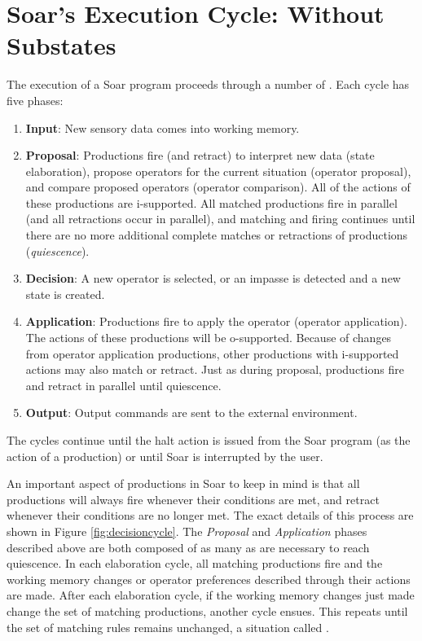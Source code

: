 \section{Soar's Execution Cycle: Without Substates}
\label{ARCH-decision}


The execution of a Soar program proceeds through a number of . Each cycle has five phases:

\begin{enumerate} 
\item \textbf{Input}: 
	New sensory data comes into working memory.
\item \textbf{Proposal}: 
	Productions fire (and retract) to interpret new data (state elaboration), propose operators for the current situation (operator proposal), and compare proposed operators (operator comparison).  All of the actions of these productions are i-supported.  All matched productions fire in parallel (and all retractions occur in parallel), and matching and firing continues until there are no more additional complete matches or retractions of productions (\emph{quiescence}). 
\item \textbf{Decision}:
	A new operator is selected, or an impasse is detected and a new state is created.
\item \textbf{Application}: 
	Productions fire to apply the operator (operator application).  The actions of these productions will be o-supported. Because of changes from operator application productions, other productions with i-supported actions may also match or retract. Just as during proposal, productions fire and retract in parallel until quiescence.
\item \textbf{Output}: 
	Output commands are sent to the external environment.
\end{enumerate}

The cycles continue until the halt action is issued from the Soar program (as the action of a production) or until Soar is interrupted by the user.

An important aspect of productions in Soar to keep in mind is that all productions will always fire whenever their conditions are met, and retract whenever their conditions are no longer met. The exact details of this process are shown in Figure \ref{fig:decisioncycle}. The \emph{Proposal} and \emph{Application} phases described above are both composed of as many  as are necessary to reach quiescence. In each elaboration cycle, all matching productions fire and the working memory changes or operator preferences described through their actions are made. After each elaboration cycle, if the working memory changes just made change the set of matching productions, another cycle ensues. This repeats until the set of matching rules remains unchanged, a situation called .


